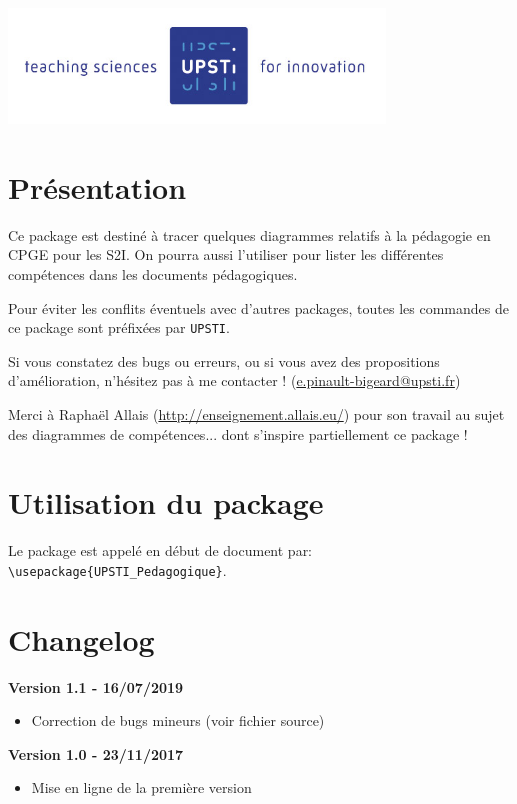 \documentclass[11pt]{ltxdockit}[2010/09/26]
\begin{document}
\printtitlepage

\begin{center}
	\includegraphics[width=10cm]{Images/logoUPSTI.jpg}
\end{center}

\tableofcontents

\section{Présentation}

Ce package est destiné à tracer quelques diagrammes relatifs à la pédagogie en CPGE pour les S2I. On pourra aussi l'utiliser pour lister les différentes compétences dans les documents pédagogiques.

Pour éviter les conflits éventuels avec d'autres packages, toutes les commandes de ce package sont préfixées par \verb!UPSTI!.

Si vous constatez des bugs ou erreurs, ou si vous avez des propositions d'amélioration, n'hésitez pas à me contacter ! (\href{mailto:e.pinault-bigeard@upsti.fr}{e.pinault-bigeard@upsti.fr})

Merci à Raphaël Allais (\href{http://enseignement.allais.eu/}{http://enseignement.allais.eu/}) pour son travail au sujet des diagrammes de compétences... dont s'inspire partiellement ce package !

\section{Utilisation du package}
\noindent Le package est appelé en début de document par: \verb!\usepackage{UPSTI_Pedagogique}!. 

\section{Changelog}
\noindent\textbf{Version 1.1 - 16/07/2019}
\begin{itemize}
\item Correction de bugs mineurs (voir fichier source)
\end{itemize}
\noindent\textbf{Version 1.0 - 23/11/2017}
\begin{itemize}
\item Mise en ligne de la première version
\end{itemize}
\end{document}
